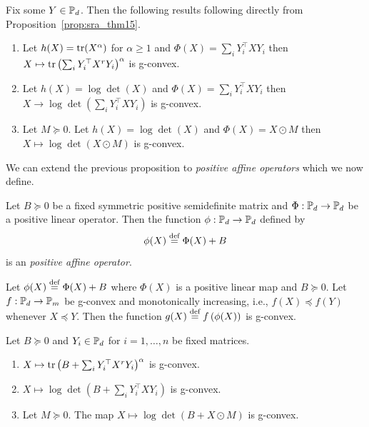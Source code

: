 \documentclass[twoside,11pt]{article}
\begin{document}
%
\begin{example}
Fix some $Y \in \mathbb{P}_d$. Then the following results following directly from Proposition~\ref{prop:sra_thm15}.
\begin{enumerate}
    \item Let $h(X) = \text{tr}(X^\alpha)$ for $\alpha \geq 1$ and $\Phi(X) = \sum_i Y_i^\top X Y_i$ then  $X \mapsto \text{tr}\left( \sum_i Y_i^\top X^r Y_i\right)^\alpha$ is g-convex.
    \item Let $h(X) = \log \det (X)$ and $\Phi(X) = \sum_i Y_i^\top X Y_i$ then $X \to \log \det\left(\sum_i Y_i^\top X Y_i\right)$ is g-convex.
    \item Let $M \succeq 0$. Let $h(X) = \log \det(X)$ and $\Phi(X) = X \odot M$ then
    $X \mapsto \log \det \left( X \odot M\right)$
    is g-convex.
\end{enumerate}
\end{example}

We can extend the previous proposition to \textit{positive affine operators} which we now define.

\begin{definition}
    Let $B \succeq 0$ be a fixed symmetric positive semidefinite matrix and $\Phi: \mathbb{P}_d \to \mathbb{P}_d$ be a positive linear operator. Then the function $\phi:\mathbb{P}_d \to \mathbb{P}_d$ defined by 
    \[
    \phi(X) \stackrel{\text{def}}{=} \Phi(X) + B
    \]
    is an \textit{positive affine operator}.
\end{definition}

\begin{prop}\label{prop:gcvx_affine_positive}

    Let  $\phi(X) \stackrel{\text{def}}{=} \Phi(X) + B$ where $\Phi(X)$ is a positive linear map and $B \succeq 0$. 
        Let $f: \mathbb{P}_d \to \mathbb{P}_m$ be g-convex and monotonically increasing, i.e., $f(X) \preceq f(Y)$ whenever $X \preceq Y$. Then the function
        $g(X) \stackrel{\text{def}}{=} f\left( \phi(X)\right)$
        is g-convex.
\end{prop}

\begin{example}
Let $B \succeq 0$ and $Y_i \in \mathbb{P}_d$ for $i = 1, \ldots, n$ be fixed matrices. 
    \begin{enumerate}
    \item  $X \mapsto \text{tr}\left(B +  \sum_i Y_i^\top X^r Y_i\right)^\alpha$ is g-convex.
    \item $X \mapsto \log \det\left( B + \sum_i Y_i^\top X Y_i\right)$ is g-convex.
    \item Let $M \succeq 0$. The map
    $X \mapsto \log \det \left(B +  X \odot M\right)$
    is g-convex.
\end{enumerate}

\end{example}
\end{document}

